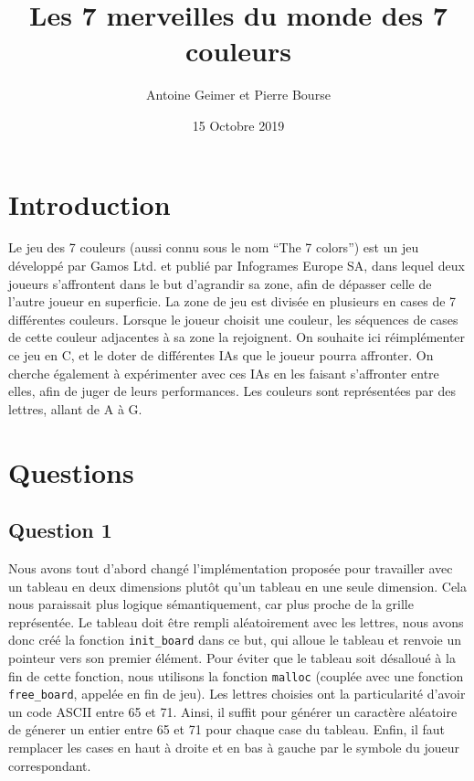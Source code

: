 \documentclass{article}
\title{Les 7 merveilles du monde des 7 couleurs}
\date{15 Octobre 2019}
\author{Antoine Geimer et Pierre Bourse}
\begin{document}
\maketitle

\section{Introduction}
    \quad Le jeu des 7 couleurs (aussi connu sous le nom \enquote{The 7 colors}) est un jeu développé par Gamos Ltd. et publié par Infogrames Europe SA, dans lequel deux joueurs s'affrontent dans le but d'agrandir sa zone, afin de dépasser celle de l'autre joueur en superficie. La zone de jeu est divisée en plusieurs en cases de 7 différentes couleurs. Lorsque le joueur choisit une couleur, les séquences de cases de cette couleur adjacentes à sa zone la rejoignent. On souhaite ici réimplémenter ce jeu en C, et le doter de différentes IAs que le joueur pourra affronter. On cherche également à expérimenter avec ces IAs en les faisant s'affronter entre elles, afin de juger de leurs performances. Les couleurs sont représentées par des lettres, allant de A à G.
\section{Questions}
\subsection{Question 1}
    Nous avons tout d'abord changé l'implémentation proposée pour travailler avec un tableau en deux dimensions plutôt qu'un tableau en une seule dimension. Cela nous paraissait plus logique sémantiquement, car plus proche de la grille représentée. Le tableau doit être rempli aléatoirement avec les lettres, nous avons donc créé la fonction \texttt{init\_board} dans ce but, qui alloue le tableau et renvoie un pointeur vers son premier élément. Pour éviter que le tableau soit désalloué à la fin de cette fonction, nous utilisons la fonction \texttt{malloc} (couplée avec une fonction \texttt{free\_board}, appelée en fin de jeu).
    Les lettres choisies ont la particularité d'avoir un code ASCII entre 65 et 71. Ainsi, il suffit pour générer un caractère aléatoire de génerer un entier entre 65 et 71 pour chaque case du tableau. Enfin, il faut remplacer les cases en haut à droite et en bas à gauche par le symbole du joueur correspondant.
\end{document}
